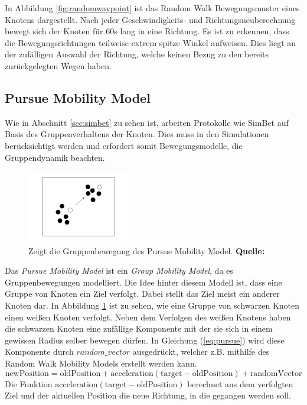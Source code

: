 \documentclass[a4paper, 12pt]{article}
\begin{document}
In Abbildung \ref{fig:randomwaypoint} ist das Random Walk Bewegungsmuster eines Knotens dargestellt. Nach jeder Geschwindigkeits- und Richtungsneuberechnung bewegt sich der Knoten für 60s lang in eine Richtung.
Es ist zu erkennen, dass die Bewegungsrichtungen teilweise extrem spitze Winkel aufweisen. Dies liegt an der zufälligen Auswahl der Richtung, welche keinen Bezug zu den bereits zurückgelegten Wegen haben.

\subsection{Pursue Mobility Model}
Wie in Abschnitt \ref{sec:simbet} zu sehen ist, arbeiten Protokolle wie SimBet auf Basis des Gruppenverhaltens der Knoten. Dies muss in den Simulationen berücksichtigt werden und erfordert somit Bewegungsmodelle, die Gruppendynamik beachten.
\begin{figure}[H]
    \centering
    \includegraphics[width=0.4\textwidth]{img/pursue.pdf}
    \caption{Zeigt die Gruppenbewegung des Pursue Mobility Model. \textbf{Quelle:} \cite{camp2002survey}}
    \label{fig:pursue}
\end{figure}
Das \emph{Pursue Mobility Model} \cite{camp2002survey} ist ein \emph{Group Mobility Model}, da es Gruppenbewegungen modelliert.
Die Idee hinter diesem Modell ist, dass eine Gruppe von Knoten ein Ziel verfolgt. Dabei stellt das Ziel meist ein anderer Knoten dar.
In Abbildung \ref{fig:pursue} ist zu sehen, wie eine Gruppe von schwarzen Knoten einen weißen Knoten verfolgt. 
Neben dem Verfolgen des weißen Knotens haben die schwarzen Knoten eine zufällige Komponente mit der sie sich in einem gewissen Radius selber bewegen dürfen.
In Gleichung (\ref{eq:pursue}) wird diese Komponente durch $random\_vector$ ausgedrückt, welcher z.B. mithilfe des Random Walk Mobility Models erstellt werden kann.
\begin{equation}
	\label{eq:pursue}
	\text{newPosition} = \text{oldPosition} + \text{acceleration}(\text{target} - \text{oldPosition}) + \text{randomVector}
\end{equation}
Die Funktion $\text{acceleration}(\text{target}-\text{oldPosition})$ berechnet aus dem verfolgten Ziel und der aktuellen Position die neue Richtung, in die gegangen werden soll.
\end{document}
